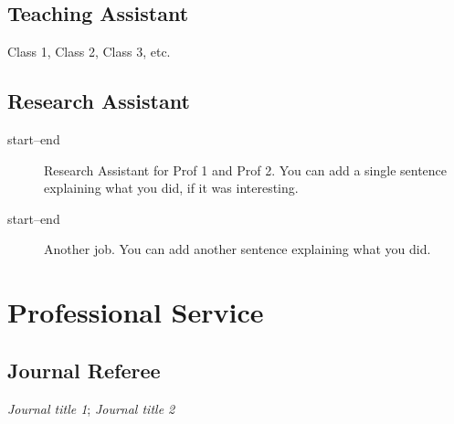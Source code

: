\documentclass[12pt]{safecv}%
\begin{document}
\subsection*{Teaching Assistant}
Class 1, Class 2, Class 3, etc.

\subsection*{Research Assistant}
\begin{description}
\item[start--end] Research Assistant for Prof 1 and Prof 2. You can
add a single sentence explaining what you did, if it was interesting.
\item[start--end] Another job. You can add another sentence
explaining what you did.
\end{description}

\section*{Professional Service}

\subsection*{Journal Referee}
\textit{Journal title 1};
\textit{Journal title 2}

\end{document}
